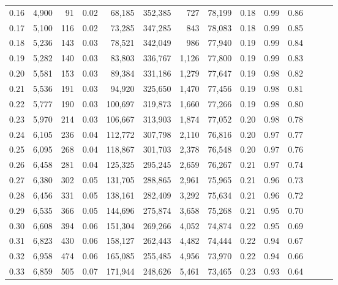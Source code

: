 \begin{tabular}{rrrrrrrrrrrrrr}
0.16 &   4,900 &     91 &  0.02 &   68,185 &  352,385 &     727 &  78,199 &  0.18 &  0.99 &      0.86 \\
0.17 &   5,100 &    116 &  0.02 &   73,285 &  347,285 &     843 &  78,083 &  0.18 &  0.99 &      0.85 \\
0.18 &   5,236 &    143 &  0.03 &   78,521 &  342,049 &     986 &  77,940 &  0.19 &  0.99 &      0.84 \\
0.19 &   5,282 &    140 &  0.03 &   83,803 &  336,767 &   1,126 &  77,800 &  0.19 &  0.99 &      0.83 \\
0.20 &   5,581 &    153 &  0.03 &   89,384 &  331,186 &   1,279 &  77,647 &  0.19 &  0.98 &      0.82 \\
0.21 &   5,536 &    191 &  0.03 &   94,920 &  325,650 &   1,470 &  77,456 &  0.19 &  0.98 &      0.81 \\
0.22 &   5,777 &    190 &  0.03 &  100,697 &  319,873 &   1,660 &  77,266 &  0.19 &  0.98 &      0.80 \\
0.23 &   5,970 &    214 &  0.03 &  106,667 &  313,903 &   1,874 &  77,052 &  0.20 &  0.98 &      0.78 \\
0.24 &   6,105 &    236 &  0.04 &  112,772 &  307,798 &   2,110 &  76,816 &  0.20 &  0.97 &      0.77 \\
0.25 &   6,095 &    268 &  0.04 &  118,867 &  301,703 &   2,378 &  76,548 &  0.20 &  0.97 &      0.76 \\
0.26 &   6,458 &    281 &  0.04 &  125,325 &  295,245 &   2,659 &  76,267 &  0.21 &  0.97 &      0.74 \\
0.27 &   6,380 &    302 &  0.05 &  131,705 &  288,865 &   2,961 &  75,965 &  0.21 &  0.96 &      0.73 \\
0.28 &   6,456 &    331 &  0.05 &  138,161 &  282,409 &   3,292 &  75,634 &  0.21 &  0.96 &      0.72 \\
0.29 &   6,535 &    366 &  0.05 &  144,696 &  275,874 &   3,658 &  75,268 &  0.21 &  0.95 &      0.70 \\
0.30 &   6,608 &    394 &  0.06 &  151,304 &  269,266 &   4,052 &  74,874 &  0.22 &  0.95 &      0.69 \\
0.31 &   6,823 &    430 &  0.06 &  158,127 &  262,443 &   4,482 &  74,444 &  0.22 &  0.94 &      0.67 \\
0.32 &   6,958 &    474 &  0.06 &  165,085 &  255,485 &   4,956 &  73,970 &  0.22 &  0.94 &      0.66 \\
0.33 &   6,859 &    505 &  0.07 &  171,944 &  248,626 &   5,461 &  73,465 &  0.23 &  0.93 &      0.64 \\

\end{tabular}
